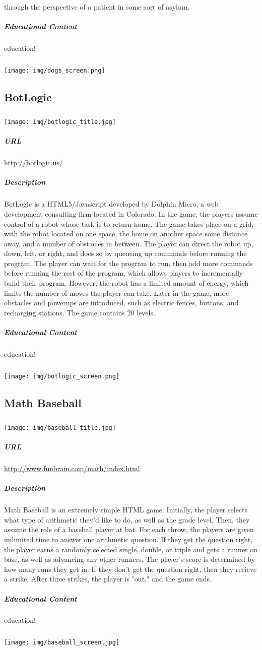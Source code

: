 through the perspective of a patient in some sort of asylum.\subparagraph{Educational Content}education!\subparagraph{}\texttt{[image: img/dogs\_screen.png]}\newpage\subsection{BotLogic}\subparagraph{}\texttt{[image: img/botlogic\_title.jpg]}\subparagraph{URL}\url{http://botlogic.us/}\subparagraph{Description}BotLogic is a HTML5/Javascript developed by Dolphin Micro, a web development consulting firm located in Colorado. In the game, the players assume control of a robot whose task is to return home. The game takes place on a grid, with the robot located on one space, the home on another space some distance away, and a number of obstacles in between. The player can direct the robot up, down, left, or right, and does so by queueing up commands before running the program. The player can wait for the program to run, then add more commands before running the rest of the program, which allows players to incrementally build their program. However, the robot has a limited amount of energy, which limits the number of moves the player can take. Later in the game, more obstacles and powerups are introduced, such as electric fences, buttons, and recharging stations. The game contains 20 levels.\subparagraph{Educational Content}education!\subparagraph{}\texttt{[image: img/botlogic\_screen.png]}\newpage\subsection{Math Baseball}\subparagraph{}\texttt{[image: img/baseball\_title.jpg]}\subparagraph{URL}\url{http://www.funbrain.com/math/index.html}\subparagraph{Description}Math Baseball is an extremely simple HTML game. Initially, the player selects what type of arithmetic they'd like to do, as well as the grade level. Then, they assume the role of a baseball player at bat. For each throw, the players are given unlimited time to answer one arithmetic question. If they get the question right, the player earns a randomly selected single, double, or triple and gets a runner on base, as well as advancing any other runners. The player's score is determined by how many runs they get in. If they don't get the question right, then they recieve a strike. After three strikes, the player is "out," and the game ends.\subparagraph{Educational Content}education!\subparagraph{}\texttt{[image: img/baseball\_screen.jpg]}\newpage
